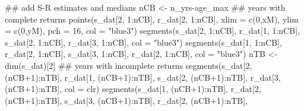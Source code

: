 \documentclass[
  11pt,
]{article}
\newenvironment{Shaded}{}{}
\newcommand{\AttributeTok}[1]{#1}
\newcommand{\DecValTok}[1]{#1}
\newcommand{\DocumentationTok}[1]{\textcolor[rgb]{0.00,0.50,0.00}{#1}}
\newcommand{\FunctionTok}[1]{#1}
\newcommand{\NormalTok}[1]{#1}
\newcommand{\OtherTok}[1]{\textcolor[rgb]{1.00,0.25,0.00}{#1}}
\newcommand{\SpecialCharTok}[1]{\textcolor[rgb]{0.00,0.50,0.50}{#1}}
\newcommand{\StringTok}[1]{\textcolor[rgb]{0.00,0.50,0.50}{#1}}
\begin{document}
\begin{Shaded}
\begin{Highlighting}[]
\DocumentationTok{\#\# add S{-}R estimates and medians}
\NormalTok{nCB }\OtherTok{\textless{}{-}}\NormalTok{ n\_yrs}\SpecialCharTok{{-}}\NormalTok{age\_max}
\DocumentationTok{\#\# years with complete returns}
\FunctionTok{points}\NormalTok{(s\_dat[}\DecValTok{2}\NormalTok{, }\DecValTok{1}\SpecialCharTok{:}\NormalTok{nCB], r\_dat[}\DecValTok{2}\NormalTok{, }\DecValTok{1}\SpecialCharTok{:}\NormalTok{nCB],}
       \AttributeTok{xlim =} \FunctionTok{c}\NormalTok{(}\DecValTok{0}\NormalTok{,xM), }\AttributeTok{ylim =} \FunctionTok{c}\NormalTok{(}\DecValTok{0}\NormalTok{,yM),}
       \AttributeTok{pch =} \DecValTok{16}\NormalTok{, }\AttributeTok{col =} \StringTok{"blue3"}\NormalTok{)}
\FunctionTok{segments}\NormalTok{(s\_dat[}\DecValTok{2}\NormalTok{, }\DecValTok{1}\SpecialCharTok{:}\NormalTok{nCB], r\_dat[}\DecValTok{1}\NormalTok{, }\DecValTok{1}\SpecialCharTok{:}\NormalTok{nCB],}
\NormalTok{         s\_dat[}\DecValTok{2}\NormalTok{, }\DecValTok{1}\SpecialCharTok{:}\NormalTok{nCB], r\_dat[}\DecValTok{3}\NormalTok{, }\DecValTok{1}\SpecialCharTok{:}\NormalTok{nCB],}
         \AttributeTok{col =} \StringTok{"blue3"}\NormalTok{)}
\FunctionTok{segments}\NormalTok{(s\_dat[}\DecValTok{1}\NormalTok{, }\DecValTok{1}\SpecialCharTok{:}\NormalTok{nCB], r\_dat[}\DecValTok{2}\NormalTok{, }\DecValTok{1}\SpecialCharTok{:}\NormalTok{nCB],}
\NormalTok{         s\_dat[}\DecValTok{3}\NormalTok{, }\DecValTok{1}\SpecialCharTok{:}\NormalTok{nCB], r\_dat[}\DecValTok{2}\NormalTok{, }\DecValTok{1}\SpecialCharTok{:}\NormalTok{nCB],}
         \AttributeTok{col =} \StringTok{"blue3"}\NormalTok{)}
\NormalTok{nTB }\OtherTok{\textless{}{-}} \FunctionTok{dim}\NormalTok{(s\_dat)[}\DecValTok{2}\NormalTok{]}
\DocumentationTok{\#\# years with incomplete returns}
\FunctionTok{segments}\NormalTok{(s\_dat[}\DecValTok{2}\NormalTok{, (nCB}\SpecialCharTok{+}\DecValTok{1}\NormalTok{)}\SpecialCharTok{:}\NormalTok{nTB], r\_dat[}\DecValTok{1}\NormalTok{, (nCB}\SpecialCharTok{+}\DecValTok{1}\NormalTok{)}\SpecialCharTok{:}\NormalTok{nTB],}
\NormalTok{         s\_dat[}\DecValTok{2}\NormalTok{, (nCB}\SpecialCharTok{+}\DecValTok{1}\NormalTok{)}\SpecialCharTok{:}\NormalTok{nTB], r\_dat[}\DecValTok{3}\NormalTok{, (nCB}\SpecialCharTok{+}\DecValTok{1}\NormalTok{)}\SpecialCharTok{:}\NormalTok{nTB],}
         \AttributeTok{col =}\NormalTok{ clr)}
\FunctionTok{segments}\NormalTok{(s\_dat[}\DecValTok{1}\NormalTok{, (nCB}\SpecialCharTok{+}\DecValTok{1}\NormalTok{)}\SpecialCharTok{:}\NormalTok{nTB], r\_dat[}\DecValTok{2}\NormalTok{, (nCB}\SpecialCharTok{+}\DecValTok{1}\NormalTok{)}\SpecialCharTok{:}\NormalTok{nTB],}
\NormalTok{         s\_dat[}\DecValTok{3}\NormalTok{, (nCB}\SpecialCharTok{+}\DecValTok{1}\NormalTok{)}\SpecialCharTok{:}\NormalTok{nTB], r\_dat[}\DecValTok{2}\NormalTok{, (nCB}\SpecialCharTok{+}\DecValTok{1}\NormalTok{)}\SpecialCharTok{:}\NormalTok{nTB],}

\end{Highlighting}
\end{Shaded}
\end{document}
